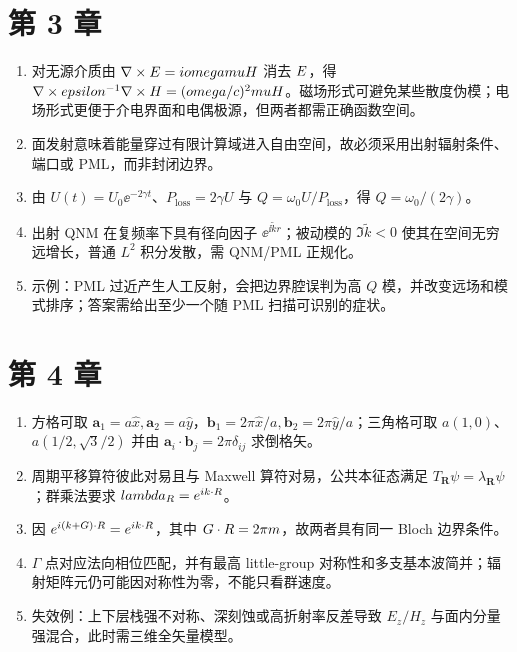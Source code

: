 \section{第 3 章}
\begin{enumerate}
  \item 对无源介质由 $\nabla\times E=iomegamuH$ 消去 $E$，得 $\nabla\times epsilon^{-1}\nabla\times H=(omega/c)^2muH$。磁场形式可避免某些散度伪模；电场形式更便于介电界面和电偶极源，但两者都需正确函数空间。
  \item 面发射意味着能量穿过有限计算域进入自由空间，故必须采用出射辐射条件、端口或 PML，而非封闭边界。
  \item 由 $U(t)=U_0\ee^{-2\gamma t}$、$P_{\mathrm{loss}}=2\gamma U$ 与 $Q=\omega_0U/P_{\mathrm{loss}}$，得 $Q=\omega_0/(2\gamma)$。
  \item 出射 QNM 在复频率下具有径向因子 $\ee^{\ii\tilde k r}$；被动模的 $\Im\tilde k<0$ 使其在空间无穷远增长，普通 $L^2$ 积分发散，需 QNM/PML 正规化。
  \item 示例：PML 过近产生人工反射，会把边界腔误判为高 $Q$ 模，并改变远场和模式排序；答案需给出至少一个随 PML 扫描可识别的症状。
\end{enumerate}

\section{第 4 章}
\begin{enumerate}
  \item 方格可取 $\bm a_1=a\hat x,\bm a_2=a\hat y$，$\bm b_1=2\pi\hat x/a,\bm b_2=2\pi\hat y/a$；三角格可取 $a(1,0)$、$a(1/2,\sqrt3/2)$ 并由 $\bm a_i\cdot\bm b_j=2\pi\delta_{ij}$ 求倒格矢。
  \item 周期平移算符彼此对易且与 Maxwell 算符对易，公共本征态满足 $T_{\bm R}\psi=\lambda_{\bm R}\psi$；群乘法要求 $lambda_{R}=e^{ik\cdot R}$。
  \item 因 $e^{i(k+G)\cdot R}=e^{ik\cdot R}$，其中 $G\cdot R=2\pi m$，故两者具有同一 Bloch 边界条件。
  \item $\Gamma$ 点对应法向相位匹配，并有最高 little-group 对称性和多支基本波简并；辐射矩阵元仍可能因对称性为零，不能只看群速度。
  \item 失效例：上下层栈强不对称、深刻蚀或高折射率反差导致 $E_z/H_z$ 与面内分量强混合，此时需三维全矢量模型。
\end{enumerate}

